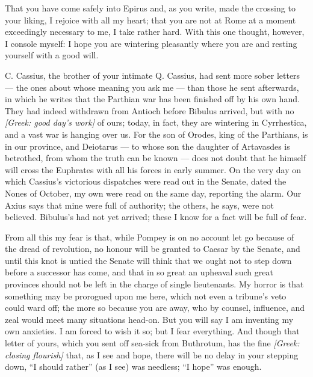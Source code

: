 

 That you have come safely into Epirus and, as you write, made the crossing to your liking, I rejoice with all my heart; that you are not at Rome at a moment exceedingly necessary to me, I take rather hard. With this one thought, however, I console myself: I hope you are wintering pleasantly where you are and resting yourself with a good will.

 C. Cassius, the brother of your intimate Q. Cassius, had sent more sober letters --- the ones about whose meaning you ask me --- than those he sent afterwards, in which he writes that the Parthian war has been finished off by his own hand. They had indeed withdrawn from Antioch before Bibulus arrived, but with no \textit{[Greek: good day's work]} of ours; today, in fact, they are wintering in Cyrrhestica, and a vast war is hanging over us. For the son of Orodes, king of the Parthians, is in our province, and Deiotarus --- to whose son the daughter of Artavasdes is betrothed, from whom the truth can be known --- does not doubt that he himself will cross the Euphrates with all his forces in early summer. On the very day on which Cassius's victorious dispatches were read out in the Senate, dated the Nones of October, my own were read on the same day, reporting the alarm. Our Axius says that mine were full of authority; the others, he says, were not believed. Bibulus's had not yet arrived; these I know for a fact will be full of fear.

 From all this my fear is that, while Pompey is on no account let go because of the dread of revolution, no honour will be granted to Caesar by the Senate, and until this knot is untied the Senate will think that we ought not to step down before a successor has come, and that in so great an upheaval such great provinces should not be left in the charge of single lieutenants. My horror is that something may be prorogued upon me here, which not even a tribune's veto could ward off; the more so because you are away, who by counsel, influence, and zeal would meet many situations head-on. But you will say I am inventing my own anxieties. I am forced to wish it so; but I fear everything. And though that letter of yours, which you sent off sea-sick from Buthrotum, has the fine \textit{[Greek: closing flourish]} that, as I see and hope, there will be no delay in your stepping down, ``I should rather'' (as I see) was needless; ``I hope'' was enough.

